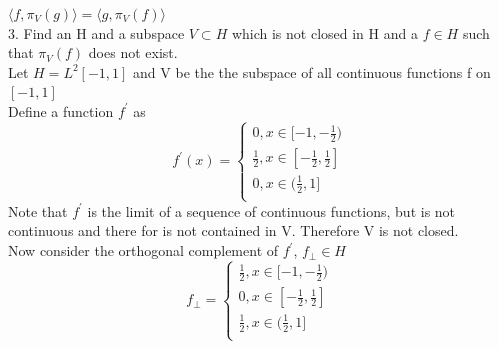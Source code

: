 \documentclass[18pt]{article}
\begin{document}
\begin{flushleft}
\vspace{.4cm}
$\langle f,\pi_V(g) \rangle=\langle g,\pi_V(f) \rangle$\\
\vspace{.4cm}
3. Find an H and a subspace $V\subset H$ which is not closed in H and a $f\in H$ such that $\pi_V(f)$ does not exist.\\
\vspace{.4cm}
Let $H=L^2[-1,1]$ and V be the the subspace of all continuous functions f on $[-1,1]$\\
\vspace{.4cm}
Define a function $f^{\prime}$ as\\
$$
f^{\prime}(x)=
\begin{cases}
0, x \in [-1,-\frac{1}{2})\\
\frac{1}{2}, x \in [-\frac{1}{2},\frac{1}{2}]\\
0, x \in (\frac{1}{2},1]\\
\end{cases}
$$
\vspace{.4cm}
Note that $f^{\prime}$ is the limit of a sequence of continuous functions, but is not\\
continuous and there for is not contained in V. Therefore V is not closed.\\
Now consider the orthogonal complement of $f^{\prime}$, $f_{\perp} \in H$\\
\vspace{.4cm}
$$
f_{\perp}=
\begin{cases}
    \frac{1}{2}, x \in [-1,-\frac{1}{2})\\
    0, x \in [-\frac{1}{2},\frac{1}{2}]\\
    \frac{1}{2}, x \in (\frac{1}{2},1]\\
\end{cases}
$$


\end{flushleft}
\end{document}
